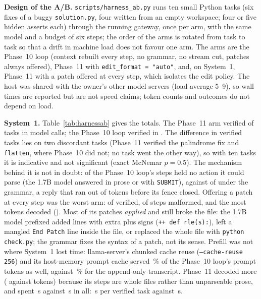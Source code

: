 \textbf{Design of the A/B.} \texttt{scripts/harness\_ab.py} runs ten small Python
tasks (six fixes of a buggy \texttt{solution.py}, four written from an empty
workspace; four or five hidden asserts each) through the running gateway, once
per arm, with the same model and a budget of six steps; the order of the arms is
rotated from task to task so that a drift in machine load does not favour one
arm. The arms are the Phase~10 loop (context rebuilt every step, no grammar, no
stream cut, patches always offered), Phase~11 with \texttt{edit\_format =
"auto"}, and, on System~1, Phase~11 with a patch offered at every step, which
isolates the edit policy. The host was shared with the owner's other model
servers (load average 5--9), so wall times are reported but are not speed
claims; token counts and outcomes do not depend on load.

\textbf{System~1.} Table~\ref{tab:harnessab} gives the totals. The Phase~11 arm
verified \HABOneNewVerified{} of \HABOneNewN{} tasks in \HABOneNewCalls{} model
calls; the Phase~10 loop verified \HABOneOldVerified{} in \HABOneOldCalls{}. The
difference in verified tasks lies on two discordant tasks (Phase~11 verified the
palindrome fix and \texttt{flatten}, where Phase~10 did not; no task went the
other way), so with ten tasks it is indicative and not significant (exact
McNemar $p=0.5$). The mechanism behind it is not in doubt: \HABOneOldMalformed{}
of the Phase~10 loop's \HABOneOldActions{} steps held no action it could parse
(the 1.7B model answered in prose or with \texttt{SUBMIT}), against
\HABOneNewMalformed{} of \HABOneNewActions{} under the grammar, a reply that ran
out of tokens before its fence closed. Offering a patch at every step was the
worst arm: \HABOneAnyVerified{} of \HABOneAnyN{} verified, \HABOneAnyMalformed{}
of \HABOneAnyActions{} steps malformed, and the most tokens decoded
(\HABOneAnyDecoded{}). Most of its patches \emph{applied} and still broke the
file: the 1.7B model prefixed added lines with extra plus signs (\texttt{++ def
rle(s):}), left a mangled \texttt{End Patch} line inside the file, or replaced
the whole file with \texttt{python check.py}; the grammar fixes the syntax of a
patch, not its sense. Prefill was not where System~1 lost time: llama-server's chunked cache
reuse (\texttt{--cache-reuse 256}) and its host-memory prompt cache served
\HABOneOldHit\,\% of the Phase~10 loop's prompt tokens as well, against
\HABOneNewHit\,\% for the append-only transcript. Phase~11 decoded more
(\HABOneNewDecoded{} against \HABOneOldDecoded{} tokens) because its steps are
whole files rather than unparseable prose, and spent \HABOneNewWall\,s against
\HABOneOldWall\,s in all: \HABOneNewWallPerVerified\,s per verified task against
\HABOneOldWallPerVerified\,s.


